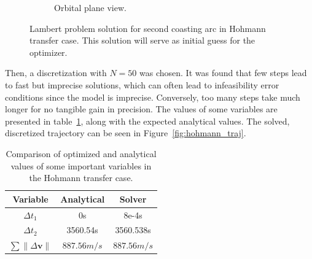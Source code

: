 \begin{figure}[htbp]
\begin{subfigure}{0.49\textwidth}
        \caption{Orbital plane view.}
    \end{subfigure}
    \caption{Lambert problem solution for second coasting arc in Hohmann transfer case. This solution will serve as initial guess for the optimizer.}
    \label{fig:hohmann_lambert}
\end{figure}

Then, a discretization with \(N = 50\) was chosen. It was found that few steps lead to fast but imprecise solutions, which can often lead to infeasibility error conditions since the model is imprecise. Conversely, too many steps take much longer for no tangible gain in precision. The values of some variables are presented in table~\ref{tab:hohmann_results}, along with the expected analytical values. The solved, discretized trajectory can be seen in Figure~\ref{fig:hohmann_traj}.

\begin{table}[htbp]
    \centering
    \begin{tabular}{ccc} \toprule
        Variable & Analytical & Solver \\ \midrule
        \(\Delta t_1\) & 0s & 8e-4s \\
        \(\Delta t_2\) & 3560.54s & 3560.538s \\
        \(\sum \lVert \Delta \mathbf{v} \rVert\) & \(887.56m/s\) & \(887.56m/s\) \\ \bottomrule
    \end{tabular}
    \caption{Comparison of optimized and analytical values of some important variables in the Hohmann transfer case.}
    \label{tab:hohmann_results}
\end{table}

